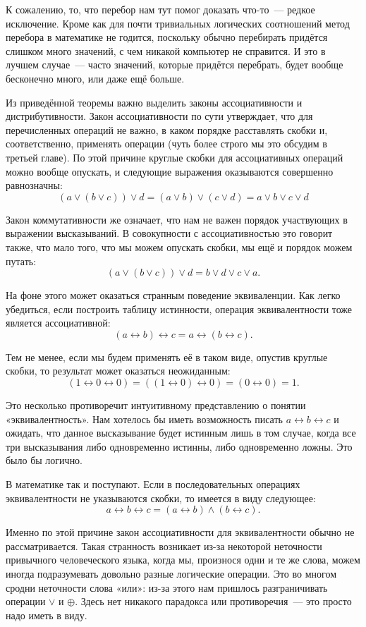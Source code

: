 К сожалению, то, что перебор нам тут помог доказать что-то~--- редкое исключение. Кроме как для почти тривиальных логических соотношений метод перебора в математике не годится, поскольку обычно перебирать придётся слишком много значений, с чем никакой компьютер не справится. И это в лучшем случае~--- часто значений, которые придётся перебрать, будет вооб\-ще беско\-неч\-но много, или даже ещё больше.

Из приведённой теоремы важно выделить законы ассоциативности и дистрибутивности. Закон ассоциативности по сути утверждает, что для перечисленных операций не важно, в каком порядке расставлять скобки и, соответственно, применять операции (чуть более строго мы это обсудим в третьей главе). По этой причине круглые скобки для ассоциативных операций можно вооб\-ще опускать, и следующие выражения оказываются совершенно равнозначны:
$$
(a \lor (b \lor c)) \lor d = (a \lor b) \lor (c \lor d) = a \lor b \lor c \lor d
$$

Закон коммутативности же означает, что нам не важен порядок участвующих в выражении высказываний. В совокупности с ассоциативностью это говорит также, что мало того, что мы можем опускать скобки, мы ещё и порядок можем путать:
$$
(a \lor (b \lor c)) \lor d = b \lor d \lor c \lor a.
$$

На фоне этого может оказаться странным поведение эквиваленции. Как легко убедиться, если построить таблицу истинности, операция эквивалентности тоже является ассоциативной:
$$
(a \leftrightarrow b) \leftrightarrow c = a \leftrightarrow (b \leftrightarrow c).
$$

Тем не менее, если мы будем применять её в таком виде, опустив круглые скобки, то результат может оказаться неожиданным:
$$
(1 \leftrightarrow 0 \leftrightarrow 0) = ((1 \leftrightarrow 0) \leftrightarrow 0) = (0 \leftrightarrow 0) = 1.
$$

Это несколько противоречит интуитивному представлению о понятии «эквивалентность». Нам хотелось бы иметь возможность писать $a \leftrightarrow b \leftrightarrow c$ и ожидать, что данное высказывание будет истинным лишь в том случае, когда все три высказывания либо одновременно истинны, либо одновременно ложны. Это было бы логично.

В математике так и поступают. Если в последовательных операциях эквивалентности не указываются скобки, то имеется в виду следующее:
$$
a \leftrightarrow b \leftrightarrow c = (a \leftrightarrow b) \land (b \leftrightarrow c).
$$

Именно по этой причине закон ассоциативности для эквивалентности обычно не рассматривается. Такая странность возникает из-за некоторой неточности привычного человеческого языка, когда мы, произнося одни и те же слова, можем иногда подразумевать довольно разные логические операции. Это во многом сродни неточности слова «или»: из-за этого нам пришлось разграничивать операции $\lor$ и $\oplus$. Здесь нет никакого парадокса или противоречия~--- это просто надо иметь в виду.

